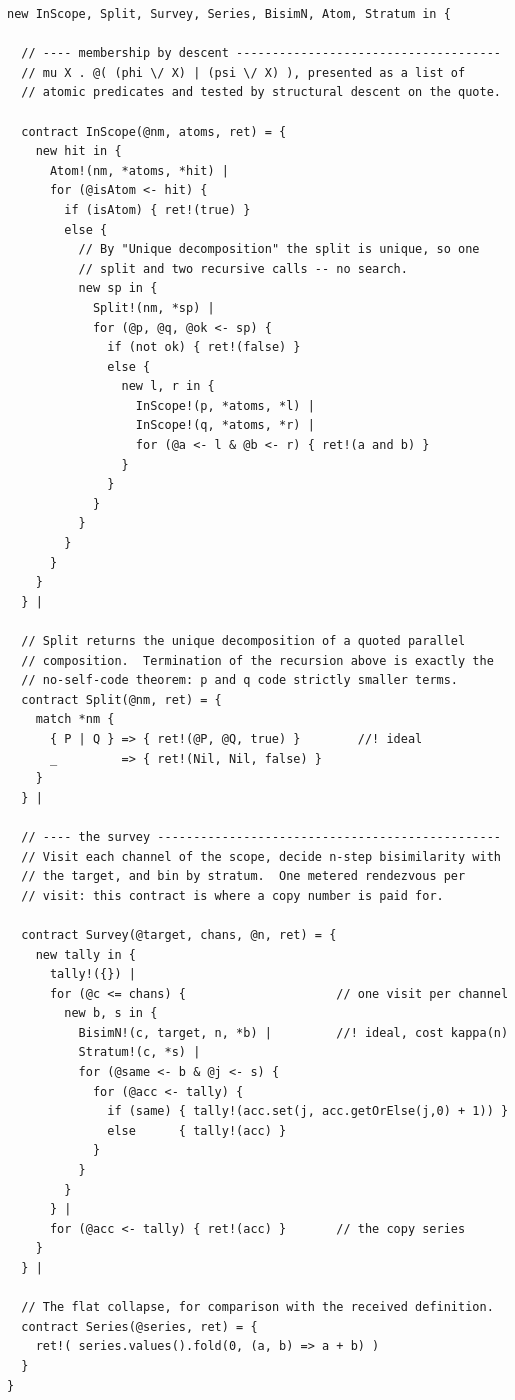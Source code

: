 \begin{lstlisting}
new InScope, Split, Survey, Series, BisimN, Atom, Stratum in {

  // ---- membership by descent -------------------------------------
  // mu X . @( (phi \/ X) | (psi \/ X) ), presented as a list of
  // atomic predicates and tested by structural descent on the quote.

  contract InScope(@nm, atoms, ret) = {
    new hit in {
      Atom!(nm, *atoms, *hit) |
      for (@isAtom <- hit) {
        if (isAtom) { ret!(true) }
        else {
          // By "Unique decomposition" the split is unique, so one
          // split and two recursive calls -- no search.
          new sp in {
            Split!(nm, *sp) |
            for (@p, @q, @ok <- sp) {
              if (not ok) { ret!(false) }
              else {
                new l, r in {
                  InScope!(p, *atoms, *l) |
                  InScope!(q, *atoms, *r) |
                  for (@a <- l & @b <- r) { ret!(a and b) }
                }
              }
            }
          }
        }
      }
    }
  } |

  // Split returns the unique decomposition of a quoted parallel
  // composition.  Termination of the recursion above is exactly the
  // no-self-code theorem: p and q code strictly smaller terms.
  contract Split(@nm, ret) = {
    match *nm {
      { P | Q } => { ret!(@P, @Q, true) }        //! ideal
      _         => { ret!(Nil, Nil, false) }
    }
  } |

  // ---- the survey ------------------------------------------------
  // Visit each channel of the scope, decide n-step bisimilarity with
  // the target, and bin by stratum.  One metered rendezvous per
  // visit: this contract is where a copy number is paid for.

  contract Survey(@target, chans, @n, ret) = {
    new tally in {
      tally!({}) |
      for (@c <= chans) {                     // one visit per channel
        new b, s in {
          BisimN!(c, target, n, *b) |         //! ideal, cost kappa(n)
          Stratum!(c, *s) |
          for (@same <- b & @j <- s) {
            for (@acc <- tally) {
              if (same) { tally!(acc.set(j, acc.getOrElse(j,0) + 1)) }
              else      { tally!(acc) }
            }
          }
        }
      } |
      for (@acc <- tally) { ret!(acc) }       // the copy series
    }
  } |

  // The flat collapse, for comparison with the received definition.
  contract Series(@series, ret) = {
    ret!( series.values().fold(0, (a, b) => a + b) )
  }
}
\end{lstlisting}

